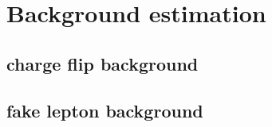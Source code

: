\chapter{Background estimation}
\label{ch:BG}

\section{charge flip background}

\section{fake lepton background}
